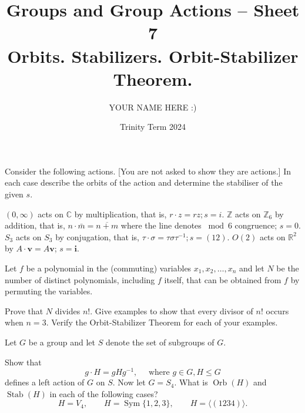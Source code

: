\documentclass[answers]{exam}
\title{Groups and Group Actions -- Sheet 7\\Orbits. Stabilizers. Orbit-Stabilizer Theorem.}
\author{YOUR NAME HERE :)}
\date{Trinity Term 2024}
\begin{document}
\maketitle
\begin{questions}
\question%
Consider the following actions. [You are not asked to show they are actions.] In each case describe the orbits of the action and determine the stabiliser of the given $s$.
\begin{subparts}
\subpart $(0, \infty)$ acts on $\mathbb{C}$ by multiplication, that is, $r \cdot z=r z ; s=i$.
\subpart $\mathbb{Z}$ acts on $\mathbb{Z}_{6}$ by addition, that is, $n \cdot \bar{m}=\overline{n+m}$ where the line denotes $\bmod 6$ congruence; $s=0$.
\subpart $S_{3}$ acts on $S_{3}$ by conjugation, that is, $\tau \cdot \sigma=\tau \sigma \tau^{-1} ; s=(12)$.
\subpart $O(2)$ acts on $\mathbb{R}^{2}$ by $A \cdot \mathbf{v}=A \mathbf{v}$; $s=\mathbf{i}$.
\end{subparts}



\question%
Let $f$ be a polynomial in the (commuting) variables $x_{1}, x_{2}, \ldots, x_{n}$ and let $N$ be the number of distinct polynomials, including $f$ itself, that can be obtained from $f$ by permuting the variables.
\begin{subparts}
\subpart Prove that $N$ divides $n!$.
\subpart Give examples to show that every divisor of $n!$ occurs when $n=3$. Verify the Orbit-Stabilizer Theorem for each of your examples.
\end{subparts}



\question%
Let $G$ be a group and let $S$ denote the set of subgroups of $G$.
\begin{subparts}
\subpart Show that \[
	g \cdot H=g H g^{-1}, \quad \text { where } g \in G, H \leqslant G
\] defines a left action of $G$ on $S$.
\subpart Now let $G=S_{4}$. What is $\operatorname{Orb}(H)$ and $\operatorname{Stab}(H)$ in each of the following cases? \[
	H=V_{4}, \qquad H=\operatorname{Sym}\{1,2,3\}, \qquad H=\langle(1234)\rangle .
\]
\end{subparts}




\end{questions}
\end{document}
